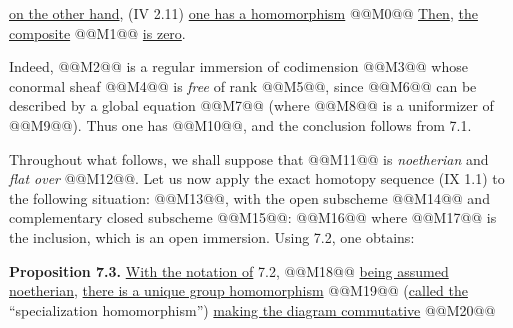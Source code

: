 
\uline{on the other hand}, (IV 2.11) \uline{one has a homomorphism}
@@M0@@
\uline{Then}, \uline{the composite}
@@M1@@
\uline{is zero}.

Indeed, @@M2@@ is a regular immersion of codimension @@M3@@ whose conormal sheaf @@M4@@ is \emph{free} of rank @@M5@@, since @@M6@@ can be described by a global equation @@M7@@ (where @@M8@@ is a uniformizer of @@M9@@). Thus one has @@M10@@, and the conclusion follows from 7.1.

Throughout what follows, we shall suppose that @@M11@@ is \emph{noetherian} and \emph{flat over} @@M12@@. Let us now apply the exact homotopy sequence (IX 1.1) to the following situation: @@M13@@, with the open subscheme @@M14@@ and complementary closed subscheme @@M15@@:
@@M16@@
where @@M17@@ is the inclusion, which is an open immersion. Using 7.2, one obtains:

\textbf{Proposition 7.3.} \uline{With the notation of} 7.2, @@M18@@ \uline{being assumed noetherian}, \uline{there is a unique group homomorphism}
@@M19@@
(\uline{called the} ``specialization homomorphism'') \uline{making the diagram commutative}
@@M20@@


\providecommand{\Kalg}{K_{\mathrm{alg}}}
\providecommand{\Gralg}{\operatorname{Gr}_{\mathrm{alg}}}
\providecommand{\Grnum}{\operatorname{Gr}_{\mathrm{num}}}
\providecommand{\Knum}{K_{\mathrm{num}}}
\providecommand{\Cl}{\operatorname{Cl}}
\providecommand{\Ch}{\operatorname{Ch}}
\providecommand{\Nm}{\operatorname{N}}
\providecommand{\colim}{\varinjlim}
\providecommand{\Hens}{\operatorname{Hens}}
\providecommand{\Spec}{\operatorname{Spec}}
\providecommand{\coker}{\operatorname{coker}}


